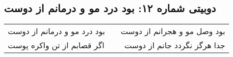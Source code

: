 \begin{center}
\section*{دوبیتی شماره ۱۲: بود درد مو و درمانم از دوست}
\label{sec:012}
\begin{longtable}{l p{0.5cm} r}
بود درد مو و درمانم از دوست
&&
بود وصل مو و هجرانم از دوست
\\
اگر قصابم از تن واکره پوست
&&
جدا هرگز نگردد جانم از دوست
\\
\end{longtable}
\end{center}
